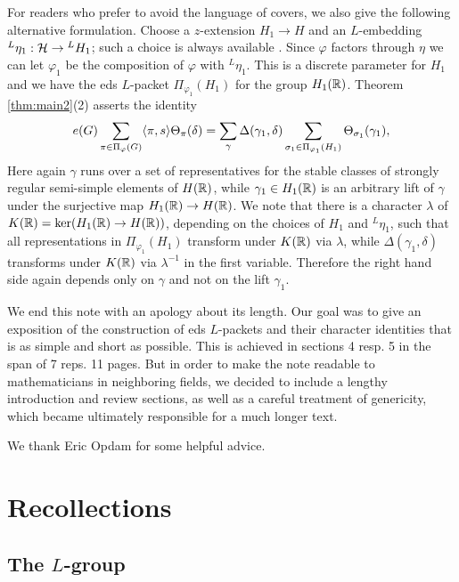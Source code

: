 \documentclass{article}
\theoremstyle{definition}
\numberwithin{equation}{section}
\renewcommand{\-}{\hyp{}}
\begin{document}
For readers who prefer to avoid the language of covers, we also give the following alternative formulation. Choose a $z$-extension $H_1 \to H$ and an $L$-embedding ${^L\eta_1} : \mathcal{H} \to {^LH_1}$; such a choice is always available \cite[\S2.2]{KS99}. Since $\varphi$ factors through $\eta$ we can let $\varphi_1$ be the composition of $\varphi$ with $^L\eta_1$. This is a discrete parameter for $H_1$ and we have the eds $L$-packet $\Pi_{\varphi_1}(H_1)$ for the group $H_1(\mathbb{R})$. Theorem \ref{thm:main2}(2) asserts the identity
\begin{equation} \label{eq:s5}
	e(G)\sum_{\pi \in \Pi_\varphi(G)}\langle\pi,s\rangle\Theta_\pi(\delta) = \sum_\gamma \Delta(\gamma_1,\delta)\sum_{\sigma_1 \in \Pi_{\varphi_1}(H_1)} \Theta_{\sigma_1}(\gamma_1),
\end{equation}
Here again $\gamma$ runs over a set of representatives for the stable classes of strongly regular semi-simple elements of $H(\mathbb{R})$, while $\gamma_1 \in H_1(\mathbb{R})$ is an arbitrary lift of $\gamma$ under the surjective map $H_1(\mathbb{R}) \to H(\mathbb{R})$. We note that there is a character $\lambda$ of $K(\mathbb{R}) = \textrm{ker}(H_1(\mathbb{R}) \to H(\mathbb{R}))$, depending on the choices of $H_1$ and $^L\eta_1$, such that all representations in $\Pi_{\varphi_1}(H_1)$ transform under $K(\mathbb{R})$ via $\lambda$, while $\Delta(\gamma_1,\delta)$ transforms under $K(\mathbb{R})$ via $\lambda^{-1}$ in the first variable. Therefore the right hand side again depends only on $\gamma$ and not on the lift $\gamma_1$.

We end this note with an apology about its length. Our goal was to give an exposition of the construction of eds $L$-packets and their character identities that is as simple and short as possible. This is achieved in sections 4 resp. 5 in the span of 7 reps. 11 pages. But in order to make the note readable to mathematicians in neighboring fields, we decided to include a lengthy introduction and review sections, as well as a careful treatment of genericity, which became ultimately responsible for a much longer text. 

We thank Eric Opdam for some helpful advice.

\section{Recollections} \label{sec:recoll}

\subsection{The $L$\-group} \label{sub:l}
\end{document}

